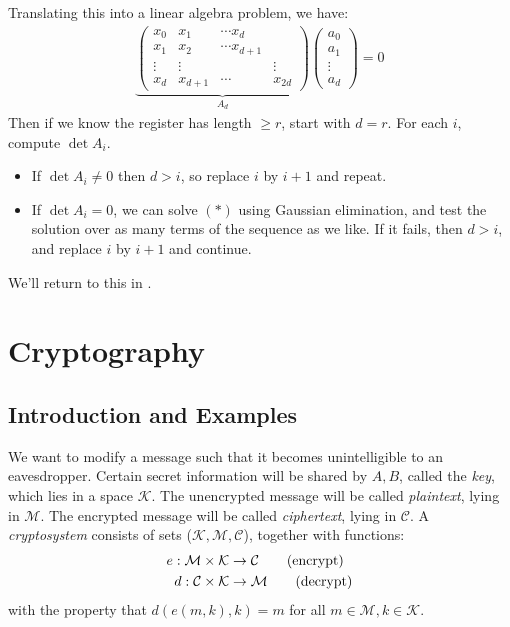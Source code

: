 \documentclass[10pt,a4paper]{article}
\begin{document}
Translating this into a linear algebra problem, we have:
\begin{align*}
\underbrace{\begin{pmatrix}
x_0 & x_1 & \cdots x_d \\
x_1 & x_2 & \cdots x_{d+1} \\
\vdots & \vdots &&\vdots \\
x_{d} & x_{d+1} & \cdots & x_{2d}
\end{pmatrix}}_{A_d} \begin{pmatrix}
a_0 \\ a_1 \\ \vdots \\ a_{d}
\end{pmatrix} = 0\tag{\ast}
\end{align*}
Then if we know the register has length $\geq r$, start with $d=r$. For each $i$, compute $\det A_i$.
\begin{itemize}
\item If $\det A_i \neq 0$ then $d > i$, so replace $i$ by $i+1$ and repeat.
\item If $\det A_i = 0$, we can solve $(\ast)$ using Gaussian elimination, and test the solution over as many terms of the sequence as we like. If it fails, then $d>i$, and replace $i$ by $i+1$ and continue.
\end{itemize}
We'll return to this in .

\section{Cryptography}
\subsection{Introduction and Examples}
We want to modify a message such that it becomes unintelligible to an eavesdropper. Certain secret information will be shared by $A, B$, called the \emph{key}, which lies in a space $\mathcal{K}$. The unencrypted message will be called \emph{plaintext}, lying in $\mathcal{M}$. The encrypted message will be called \emph{ciphertext}, lying in $\mathcal{C}$. A \emph{cryptosystem} consists of sets ($\mathcal{K, M, C}$), together with functions:
\begin{align*}
e: \mathcal{M}\times\mathcal{K} &\to \mathcal{C}\tag{\text{encrypt}}\\
d: \mathcal{C}\times\mathcal{K} &\to \mathcal{M}\tag{\text{decrypt}}
\end{align*}
with the property that $d(e(m,k),k) = m$ for all $m \in \mathcal{M}, k \in \mathcal{K}$.
\end{document}
